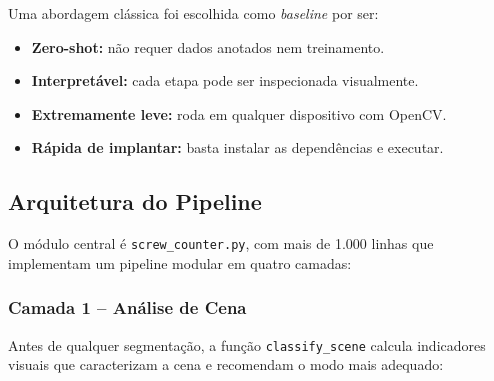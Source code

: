 \documentclass[12pt,a4paper]{article}
\begin{document}
Uma abordagem cl\'assica foi escolhida como \emph{baseline} por ser:
\begin{itemize}[leftmargin=*]
  \item \textbf{Zero-shot:} n\~ao requer dados anotados nem treinamento.
  \item \textbf{Interpret\'avel:} cada etapa pode ser inspecionada visualmente.
  \item \textbf{Extremamente leve:} roda em qualquer dispositivo com OpenCV.
  \item \textbf{R\'apida de implantar:} basta instalar as depend\^encias e executar.
\end{itemize}

\subsection{Arquitetura do Pipeline}

O m\'odulo central \'e \texttt{screw\_counter.py}, com mais de 1.000 linhas que implementam
um pipeline modular em quatro camadas:

\begin{center}
\end{center}

\subsubsection{Camada 1 -- An\'alise de Cena}

Antes de qualquer segmenta\c{c}\~ao, a fun\c{c}\~ao \texttt{classify\_scene} calcula
indicadores visuais que caracterizam a cena e recomendam o modo mais adequado:
\end{document}
